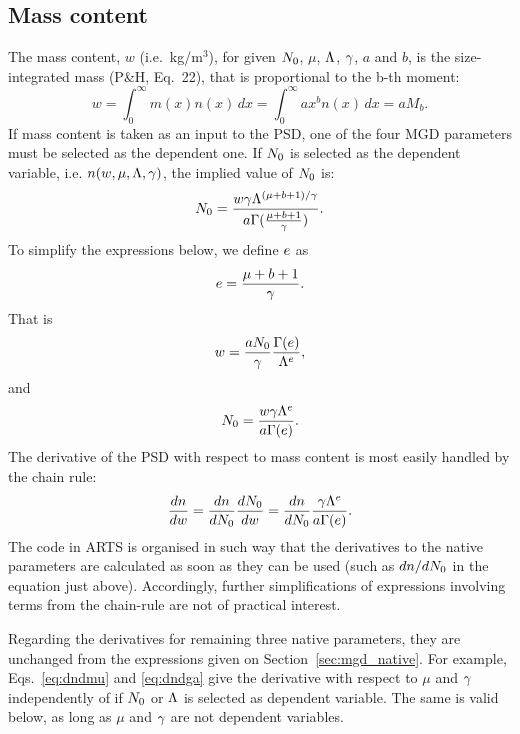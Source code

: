 \subsection{Mass content}
%
The mass content, $w$ (i.e.\ kg/m$^3$), for given $N_0$, $\mu$, $\Lambda$, $\gamma$,
$a$ and $b$, is the size-integrated mass (P\&H, Eq.~22), that is proportional to
the b-th moment:
\begin{equation}
  w = \int_0^\infty m(x) n(x)\, dx = \int_0^\infty ax^b n(x)\, dx = aM_b.
\end{equation}
If mass content is taken as an input to the PSD, one of the four MGD parameters
must be selected as the dependent one. If $N_0$ is selected as the dependent
variable, i.e. $n(w,\mu,\Lambda,\gamma)$, the implied value of $N_0$ is:
\begin{equation}
  N_0 = \frac{w\gamma\Lambda^{(\mu+b+1)/\gamma}}{a\Gamma(\frac{\mu+b+1}{\gamma})}.
\end{equation}
To simplify the expressions below, we define $e$ as
\begin{equation}
  e = \frac{\mu+b+1}{\gamma}.
\end{equation}
That is
\begin{equation}
  w = \frac{aN_0}{\gamma}\frac{\Gamma(e)}{\Lambda^e},
  \label{eq:wfrommomb}
\end{equation}
and
\begin{equation}
  N_0 = \frac{w\gamma\Lambda^e}{a\Gamma(e)}.  
  \label{eq:n0fromw}
\end{equation}
The derivative of the PSD with respect to mass content is most easily handled
by the chain rule:
\begin{equation}
  \frac{dn}{dw} = \frac{dn}{dN_0}\frac{dN_0}{dw} = \frac{dn}{dN_0} 
   \frac{\gamma\Lambda^e}{a\Gamma(e)}.
  \label{eq:dn0dw}
\end{equation}
The code in ARTS is organised in such way that the derivatives to the native
parameters are calculated as soon as they can be used (such as $dn/dN_0$ in the
equation just above). Accordingly, further simplifications of expressions
involving terms from the chain-rule are not of practical interest. 

Regarding the derivatives for remaining three native parameters, they are
unchanged from the expressions given on Section~\ref{sec:mgd_native}. For
example, Eqs.~\ref{eq:dndmu} and \ref{eq:dndga} give the derivative with
respect to $\mu$ and $\gamma$ independently of if $N_0$ or $\Lambda$ is selected as
dependent variable. The same is valid below, as long as $\mu$ and $\gamma$ are not
dependent variables.

